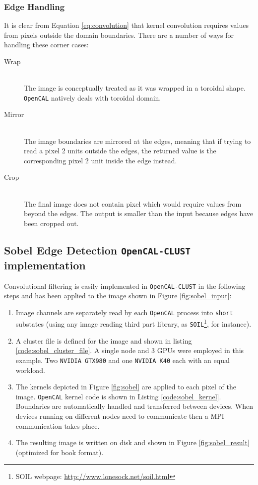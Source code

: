 \subsubsection{Edge Handling}
It is clear from Equation \ref{eq:convolution} that kernel convolution requires values from pixels outside the domain boundaries. There are a number of ways for handling these corner cases:
\begin{description}
    \item[Wrap] \hfill \\The image is conceptually treated as it was wrapped in a toroidal shape. \texttt{OpenCAL} natively deals with toroidal domain.
    \item[Mirror] \hfill \\
    The image boundaries are mirrored at the edges, meaning that if trying to read a pixel 2 units outside the edges, the returned value is the corresponding pixel 2 unit inside the edge instead.
    \item [Crop]\hfill \\
    The final image does not contain pixel which would require values from beyond the edges. The output is smaller than the input because edges have been cropped out.
\end{description}


\subsection{Sobel Edge Detection \texttt{OpenCAL-CLUST} implementation}
\label{sec:convolutional_filters_example}
Convolutional filtering is easily implemented in \texttt{OpenCAL-CLUST} in the following steps and has been applied to the image shown in Figure \ref{fig:sobel_input}:
\begin{enumerate}
    \item Image channels are separately read by each \texttt{OpenCAL} process into \texttt{short} substates (using any image reading third part library, as \texttt{SOIL}\footnote{SOIL webpage: \url{http://www.lonesock.net/soil.html}}, for instance).
    \item A cluster file is defined for the image and shown in listing \ref{code:sobel_cluster_file}. A single node and 3 GPUs were employed in this example. Two \texttt{NVIDIA GTX980} and one \texttt{NVIDIA K40} each with an equal workload.
    \item The kernels depicted in Figure \ref{fig:sobel} are applied to each pixel of the image. \texttt{OpenCAL} kernel code is shown in Listing \ref{code:sobel_kernel}.  Boundaries are automatically handled and transferred  between devices. When devices running on different nodes need to communicate then a MPI communication takes place.
    \item The resulting image is written on disk and  shown in Figure \ref{fig:sobel_result} (optimized for book format).
\end{enumerate}

